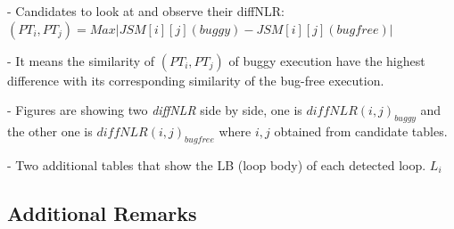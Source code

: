 - Candidates to look at and observe their diffNLR: $(PT_i, PT_j) = Max | JSM[i][j](buggy) - JSM[i][j](bugfree)| $

- It means the similarity of $(PT_i, PT_j)$ of buggy execution have the highest difference with its corresponding similarity of the bug-free execution. 

- Figures are showing two \textit{diffNLR} side by side, one is $diffNLR(i,j)_{buggy}$ and the other one is  $diffNLR(i,j)_{bugfree}$ where $i, j$ obtained from candidate tables.

- Two additional tables that show the LB (loop body) of each detected loop. $L_i$

\subsection{Additional Remarks}
\label{subsec:addrem}